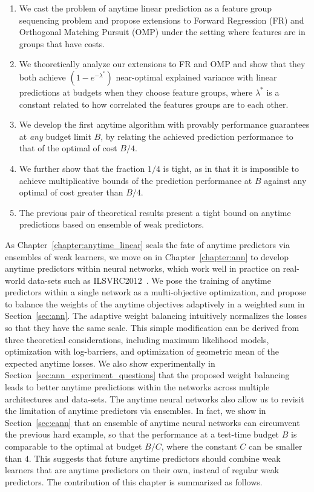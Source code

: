 \begin{enumerate}
\item We cast the problem of anytime linear prediction 
as a feature group sequencing problem  
and propose extensions to Forward Regression (FR) and Orthogonal Matching Pursuit (OMP)
under the setting where features are in
groups that have costs. 
\item We theoretically analyze our extensions to FR and OMP 
and show that they both achieve $(1-e^{-\lambda^*})$ near-optimal 
explained variance with linear predictions at budgets when 
they choose feature groups, where $\lambda^*$ is a constant related to how correlated the 
features groups are to each other.
\item We develop the first anytime algorithm 
with provably performance guarantees at \textit{any} budget limit $B$, 
by relating the achieved prediction performance to that of the optimal of cost 
$B/4$. 
\item We further show that the fraction $1/4$ is tight, as in that it is 
impossible to achieve multiplicative bounds of the prediction performance at $B$ 
against any optimal of cost greater than $B/4$. 
\item The previous pair of theoretical results  present a tight bound on 
anytime predictions based on ensemble of weak predictors.
\end{enumerate}

As Chapter~\ref{chapter:anytime_linear} seals the fate of anytime predictors via ensembles of weak learners, we move on in Chapter~\ref{chapter:ann} to develop anytime predictors within neural networks, which work well in practice on real-world data-sets such as ILSVRC2012~\citep{ILSVRC15}. We pose the training of anytime predictors within a single network as a multi-objective optimization, and propose to balance the weights of the anytime objectives adaptively in a weighted sum in Section~\ref{sec:ann}. The adaptive weight balancing intuitively normalizes the losses so that they have the same scale. This simple modification can be derived from three theoretical considerations, including maximum likelihood models, optimization with log-barriers, and optimization of geometric mean of the expected anytime losses. We also show experimentally in Section~\ref{sec:ann_experiment_questions} that the proposed weight balancing leads to better anytime predictions within the networks across multiple architectures and data-sets. The anytime neural networks also allow us to revisit the limitation of anytime predictors via ensembles. In fact, we show in Section~\ref{sec:eann} that an ensemble of anytime neural networks can circumvent the previous hard example, so that the performance at a test-time budget $B$ is comparable to the optimal at budget $B/C$, where the constant $C$ can be smaller than $4$. This suggests that future anytime predictors should combine weak learners that are anytime predictors on their own, instead of regular weak predictors.
The contribution of this chapter is summarized as follows.


